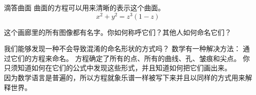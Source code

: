 ﻿\begin{surferPage}{滴答曲面}
曲面的方程可以用来清晰的表示这个曲面。 \\
\smallskip
\[x^2 + y^2	= z^3	(1 - z) \]

\singlespacing

这个画廊里的所有图像都有名字。你如何称呼它们？其他人如何命名它们？\\

\vspace{0.3cm}

我们能够发现一种不会导致混淆的命名形状的方式吗？ 数学有一种解决方法： 通过它们的方程来命名。 方程确定了所有的点、所有的曲线、孔、皱痕和尖点。 你只须知道如何在它们的公式中发现这些形式，并且知道如何把它们画出来。\\

\vspace{0.3cm}
因为数学语言是普遍的，所以方程就象乐谱一样被写下来并且以同样的方式用来解释世界。
\end{surferPage}
